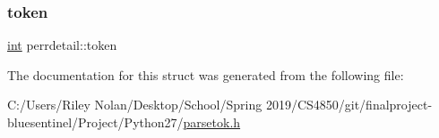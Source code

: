 \mbox{\label{structperrdetail_a37c1a341622c0f1e2d3d6968d1008472}} 
\subsubsection{\texorpdfstring{token}{token}}
{\footnotesize\ttfamily \mbox{\hyperlink{warnings_8h_a74f207b5aa4ba51c3a2ad59b219a423b}{int}} perrdetail\+::token}



The documentation for this struct was generated from the following file\+:\begin{DoxyCompactItemize}
\item 
C\+:/\+Users/\+Riley Nolan/\+Desktop/\+School/\+Spring 2019/\+C\+S4850/git/finalproject-\/bluesentinel/\+Project/\+Python27/\mbox{\hyperlink{parsetok_8h}{parsetok.\+h}}\end{DoxyCompactItemize}
